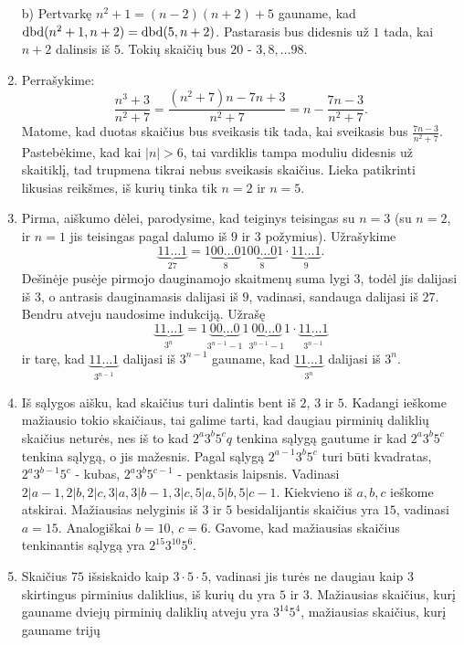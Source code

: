 \begin{enumerate}
    b) Pertvarkę $n^2 + 1 = (n-2)(n+2) +5$ gauname, kad $\operatorname{dbd}(n^2 + 1,
    n+2) = \operatorname{dbd}(5,n+2)$. Pastarasis bus didesnis už $1$ tada, kai
    $n+2$ dalinsis iš $5$. Tokių skaičių bus $20$ - $3, 8, \dots 98$.
\item
    Perrašykime: $$\frac{n^3+3}{n^2+7} = \frac{(n^2+7)n - 7n + 3}{n^2+7} =
    n - \frac{7n-3}{n^2+7}.$$
    Matome, kad duotas skaičius bus sveikasis tik tada, kai sveikasis bus
    $\frac{7n-3}{n^2+7}.$ Pastebėkime, kad kai $|n|>6$, tai vardiklis tampa
    moduliu didesnis už skaitiklį, tad trupmena tikrai nebus sveikasis
    skaičius. Lieka patikrinti likusias reikšmes, iš kurių tinka tik
    $n=2$ ir $n=5$.
\item
    Pirma, aiškumo dėlei, parodysime, kad teiginys teisingas su $n=3$
    (su $n=2$, ir $n=1$ jis teisingas pagal dalumo iš $9$ ir $3$
    požymius). Užrašykime $$\underbrace{11\ldots1}_{27} =
    1\underbrace{00\ldots0}_{8}1\underbrace{00\ldots0}_{8}1\cdot
    \underbrace{11\ldots1}_{9}.$$ Dešinėje pusėje pirmojo dauginamojo
    skaitmenų suma lygi $3$, todėl jis dalijasi iš $3$, o antrasis
    dauginamasis dalijasi iš $9$, vadinasi, sandauga dalijasi iš $27$.
    Bendru atveju naudosime indukciją. Užrašę
    $$\underbrace{11\ldots1}_{3^n} =
    1\underbrace{00\ldots0}_{3^{n-1}
    -1}1\underbrace{00\ldots0}_{3^{n-1}-1}1\cdot
    \underbrace{11\ldots1}_{3^{n-1}}$$ ir tarę, kad
    $\underbrace{11\ldots1}_{3^{n-1}}$ dalijasi iš $3^{n-1}$ gauname, kad
    $\underbrace{11\ldots1}_{3^{n}}$ dalijasi iš $3^{n}$.
\item
    Iš sąlygos aišku, kad skaičius turi dalintis bent iš $2$, $3$ ir
    $5$. Kadangi ieškome mažiausio tokio skaičiaus, tai galime tarti, kad
    daugiau pirminių daliklių skaičius neturės, nes iš to kad $2^a3^b5^cq$
    tenkina sąlygą gautume ir kad $2^a3^b5^c$ tenkina sąlygą, o jis
    mažesnis. Pagal sąlygą $2^{a-1}3^b5^c$ turi būti kvadratas,
    $2^a3^{b-1}5^c$ - kubas, $2^a3^b5^{c-1}$ - penktasis laipsnis.
    Vadinasi $2|a-1, 2|b, 2|c, 3|a, 3|b-1, 3|c, 5|a, 5|b, 5|c-1$.
    Kiekvieno iš $a,b,c$ ieškome atskirai. Mažiausias nelyginis iš
    $3$ ir $5$ besidalijantis skaičius yra $15$, vadinasi $a=15$.
    Analogiškai $b=10$, $c=6$. Gavome, kad mažiausias skaičius tenkinantis
    sąlygą yra $2^{15}3^{10}5^6$.
\item
    Skaičius $75$ išsiskaido kaip $3\cdot 5\cdot5$, vadinasi jis turės ne
    daugiau kaip $3$ skirtingus pirminius daliklius, iš kurių du yra
    $5$ ir $3$. Mažiausias skaičius, kurį gauname dviejų pirminių daliklių
    atveju yra $3^{14}5^4$, mažiausias skaičius, kurį gauname trijų

\end{enumerate}
